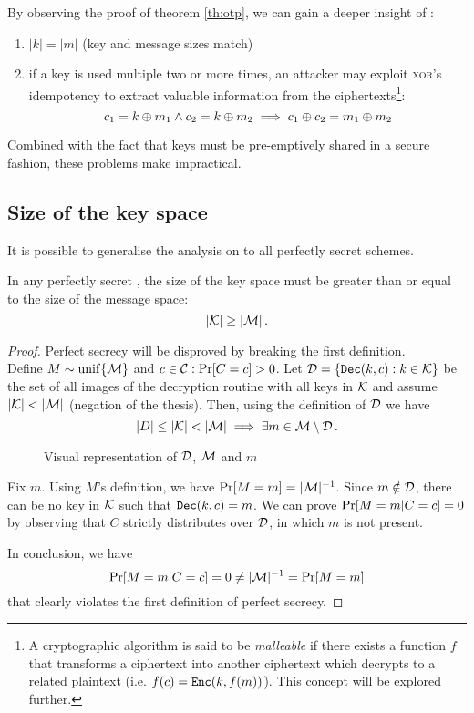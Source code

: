 
By observing the proof of theorem \ref{th:otp}, we can  gain a deeper insight of \otp:
%
\begin{enumerate}
    \item $|k| = |m|$ (key and message sizes match)
    \item if a key is used multiple two or more times, an attacker may exploit \textsc{xor}'s idempotency to extract valuable information from the ciphertexts\footnote{A cryptographic algorithm is said to be \emph{malleable} if there exists a function $f$ that transforms a ciphertext into another ciphertext which decrypts to a related plaintext (i.e. $f(c) = \texttt{Enc}(k, f(m))$). This concept will be explored further.}:
    \[
        c_1 = k \oplus m_1 \wedge c_2 = k \oplus m_2 \implies c_1 \oplus c_2 = m_1 \oplus m_2
    \]
\end{enumerate}
%
Combined with the fact that keys must be pre-emptively shared in a secure fashion, these problems make \otp{} impractical.


\subsection{Size of the key space}
It is possible to generalise the analysis on \otp{} to all perfectly secret schemes.

\begin{theorem}
    In any perfectly secret \ske, the size of the key space must be greater than or equal to the size of the message space:
    \[
    	|\mathcal{K}| \geq |\mathcal{M}| \, .
    \]
\end{theorem}
\begin{proof}
    Perfect secrecy will be disproved by breaking the first definition. \\
    Define $M \sim \operatorname{unif}\{\mathcal{M}\}$ and $c \in \mathcal{C} : \Pr[C = c] > 0$.
    Let $\mathcal{D} = \{\texttt{Dec}(k, c) : k \in \mathcal{K}\}$ be the set of all images of the decryption routine with all keys in $\mathcal{K}$ and assume $|\mathcal{K}| < |\mathcal{M}|$ (negation of the thesis).
    Then, using the definition of $\mathcal{D}$ we have
    \[
        |D| \leq |\mathcal{K}| < |\mathcal{M}| \implies \exists m \in \mathcal{M} \setminus \mathcal{D} \, .
    \]
    
    \begin{figure}[h]
    	\centering
    	
    	\caption{Visual representation of $\mathcal{D}$, $\mathcal{M}$ and $m$}
    \end{figure}

    Fix $m$. Using $M$'s definition, we have $\Pr[M = m] = |\mathcal{M}|^{-1}$.
    Since $m \notin \mathcal{D}$, there can be no key in $\mathcal{K}$ such that $\texttt{Dec}(k, c) = m$.
    We can prove $\Pr[M = m|C = c] = 0$ by observing that $C$ strictly distributes over $\mathcal{D}$, in which $m$ is not present.
    
    In conclusion, we have
    \[
        \Pr[M = m|C = c] = 0 \neq |\mathcal{M}|^{-1} = \Pr[M = m]
    \]
    that clearly violates the first definition of perfect secrecy.
\end{proof}
